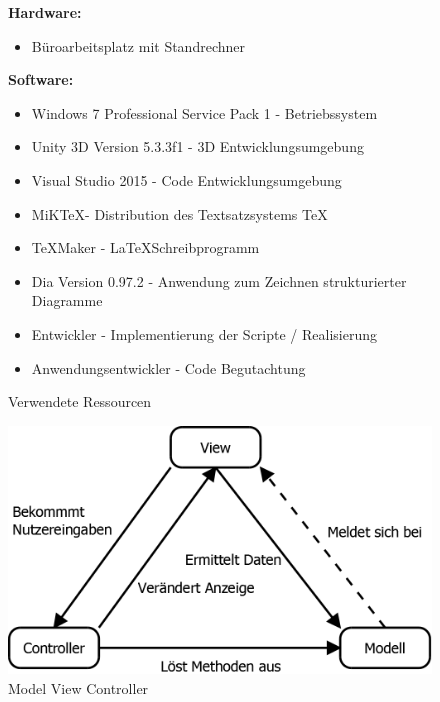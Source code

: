 \begin{figure}[H]
\raggedright
\caption{Verwendete Ressourcen}
\label{Abb:Ressourcen}
\textbf{Hardware:}
\begin{itemize}
\item Büroarbeitsplatz mit Standrechner
\end{itemize}
\textbf{Software:}
\begin{itemize}
\item Windows 7 Professional Service Pack 1 - Betriebssystem
\item Unity 3D Version 5.3.3f1 - 3D Entwicklungsumgebung
\item Visual Studio 2015 - Code Entwicklungsumgebung
\item MiK\TeX - Distribution des Textsatzsystems \TeX
\item \TeX{}Maker - \LaTeX Schreibprogramm
\item Dia Version 0.97.2 - Anwendung zum Zeichnen strukturierter Diagramme
\end{itemize}
\begin{itemize}
\item Entwickler - Implementierung der Scripte / Realisierung
\item Anwendungsentwickler - Code Begutachtung
\end{itemize}
\end{figure}


\begin{figure}[H]
\centering
\caption{Model View Controller}
\label{Abb:MVC}
\includegraphics[scale=0.5]{Bilder/Diagramme/MVC.png}
\end{figure}

